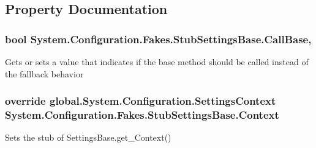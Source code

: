 \subsection{Property Documentation}
\hypertarget{class_system_1_1_configuration_1_1_fakes_1_1_stub_settings_base_a5e6f77066f1b9b35051130f2797a5ac5}{
\subsubsection[{Call\-Base}]{\setlength{\rightskip}{0pt plus 5cm}bool System.\-Configuration.\-Fakes.\-Stub\-Settings\-Base.\-Call\-Base\hspace{0.3cm}{\ttfamily [get]}, {\ttfamily [set]}}}\label{class_system_1_1_configuration_1_1_fakes_1_1_stub_settings_base_a5e6f77066f1b9b35051130f2797a5ac5}


Gets or sets a value that indicates if the base method should be called instead of the fallback behavior

\hypertarget{class_system_1_1_configuration_1_1_fakes_1_1_stub_settings_base_a3e1811dd1d27f7d4c11fbad319ac5613}{
\subsubsection[{Context}]{\setlength{\rightskip}{0pt plus 5cm}override global.\-System.\-Configuration.\-Settings\-Context System.\-Configuration.\-Fakes.\-Stub\-Settings\-Base.\-Context\hspace{0.3cm}{\ttfamily [get]}}}\label{class_system_1_1_configuration_1_1_fakes_1_1_stub_settings_base_a3e1811dd1d27f7d4c11fbad319ac5613}


Sets the stub of Settings\-Base.\-get\-\_\-\-Context()

